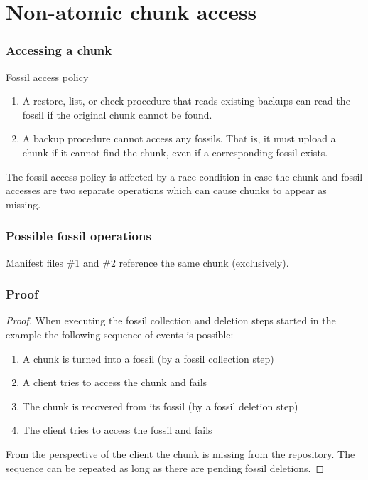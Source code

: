 \documentclass[english,utf8,aspectratio=169]{beamer}
\begin{document}
    \section{Non-atomic chunk access}
    \begin{frame}
        \frametitle{Accessing a chunk}
        \begin{block}{Fossil access policy~\cite[Policy 2]{Duplicacy}}
            \begin{enumerate}
                \item A restore, list, or check procedure that reads existing backups
                    can read the fossil if the original chunk cannot be found.
                \item A backup procedure cannot access any fossils.
                    That is, it must upload a chunk if it cannot find the chunk,
                    even if a corresponding fossil exists.
            \end{enumerate}
        \end{block}
        \begin{theorem}
            The fossil access policy is affected by a race condition in case the chunk and fossil
            accesses are two separate operations which can cause chunks to appear as missing.
        \end{theorem}
    \end{frame}

    \begin{frame}
        \frametitle{Possible fossil operations}
        Manifest files \#1 and \#2 reference the same chunk (exclusively).
        \begin{center}
            
        \end{center}
    \end{frame}

    \begin{frame}
        \frametitle{Proof}
        \begin{proof}
            When executing the fossil collection and deletion steps started in the example the
            following sequence of events is possible:
            \begin{enumerate}
                \item A chunk is turned into a fossil (by a fossil collection step)
                \item A client tries to access the chunk and fails
                \item The chunk is recovered from its fossil (by a fossil deletion step)
                \item The client tries to access the fossil and fails
            \end{enumerate}
            From the perspective of the client the chunk is missing from the repository.
            The sequence can be repeated as long as there are pending fossil deletions.
        \end{proof}
    \end{frame}
\end{document}
